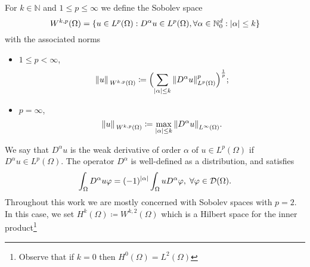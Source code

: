\begin{definition}
    For \(k \in \mathbb{N}\) and \(1 \leq p \leq \infty\) we define the Sobolev space
    \[
    W^{k,p}(\Omega) = \{u \in L^p(\Omega): D^\alpha u \in L^p(\Omega), \forall \alpha \in \mathbb{N}_0^d: \abs{\alpha} \leq k\}
    \]
    with the associated norms
    \begin{itemize}
        \item \(1 \leq p < \infty\),
            \[
            \norm*{u}_{W^{k,p}(\Omega)} \coloneqq \Bigl(\sum_{\abs{\alpha} \leq k} \norm{D^\alpha u}_{L^p(\Omega)}^p\Bigr)^{\frac{1}{p}};
            \]
            \item \(p = \infty\),
            \[
            \norm*{u}_{W^{k,p}(\Omega)} \coloneqq \max_{\abs{\alpha} \leq k} \norm{D^\alpha u}_{L^\infty(\Omega)}.
            \]
    \end{itemize}

\end{definition}
We say that \(D^\alpha u\) is the weak derivative of order \(\alpha\) of \(u \in L^p(\Omega)\) if \(D^\alpha u \in L^p(\Omega)\). The operator \(D^\alpha\) is well-defined as a distribution, and satisfies
\[
    \int_\Omega D^\alpha u \varphi = (-1)^\abs{\alpha} \int_\Omega u D^\alpha \varphi, \; \forall \varphi \in \mathcal{D}(\Omega).
\] 
Throughout this work we are mostly concerned with Sobolev spaces with \(p=2\). In this case, we set \(H^k(\Omega) \coloneqq W^{k, 2}(\Omega)\) which is a Hilbert space for the inner product\footnote{Observe that if \(k=0\) then \(H^0(\Omega) = L^2(\Omega)\)}
